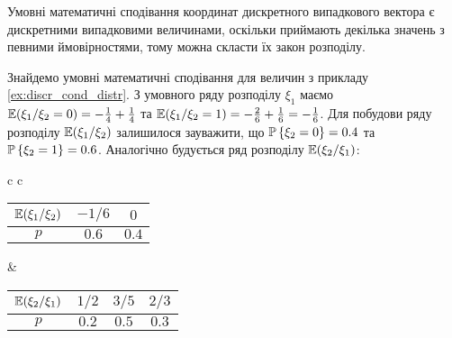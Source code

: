 Умовні математичні сподівання координат дискретного випадкового вектора є дискретними випадковими величинами, оскільки 
приймають декілька значень з певними ймовірностями, тому можна скласти 
їх закон розподілу.
\begin{example}\label{ex:discr_cond_distr_2}
    Знайдемо умовні математичні сподівання для величин з прикладу \ref{ex:discr_cond_distr}.
    З умовного ряду розподілу $\xi_1$ маємо $\E(\xi_1 / \xi_2 = 0) = -\frac{1}{4} + \frac{1}{4}$ та
    $\E(\xi_1 / \xi_2 = 1) = -\frac{2}{6} + \frac{1}{6} = -\frac{1}{6}$. Для побудови ряду розподілу $\E(\xi_1 / \xi_2)$
    залишилося зауважити, що $\P\left\{\xi_2 = 0\right\} = 0.4$ та $\P\left\{\xi_2 = 1\right\} = 0.6$.
    Аналогічно будується ряд розподілу $\E(\xi_2 / \xi_1)$:
    \begin{center}
        \begin{tabular}{c c}
            \begin{tabular}{|c|c|c|}
                \hline
                $\E(\xi_1 / \xi_2)$ & $-1/6$ & $0$ \\
                \hline
                $p$ & $0.6$ & $0.4$ \\
                \hline
            \end{tabular}
            &
            \begin{tabular}{|c|c|c|c|}
                \hline
                $\E(\xi_2 / \xi_1)$ & $1/2$ & $3/5$ & $2/3$ \\
                \hline
                $p$ & $0.2$ & $0.5$ & $0.3$ \\
                \hline
            \end{tabular}
        \end{tabular}
    \end{center}
\end{example}

